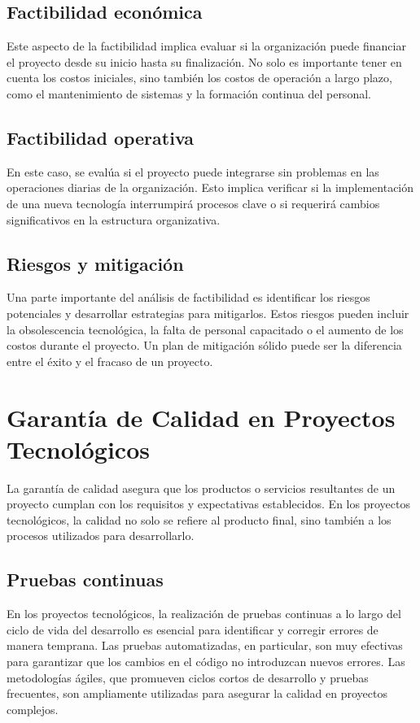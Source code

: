 \documentclass[12pt]{article}
\begin{document}
\subsection{Factibilidad económica}
Este aspecto de la factibilidad implica evaluar si la organización puede financiar el proyecto desde su inicio hasta su finalización. No solo es importante tener en cuenta los costos iniciales, sino también los costos de operación a largo plazo, como el mantenimiento de sistemas y la formación continua del personal.

\subsection{Factibilidad operativa}
En este caso, se evalúa si el proyecto puede integrarse sin problemas en las operaciones diarias de la organización. Esto implica verificar si la implementación de una nueva tecnología interrumpirá procesos clave o si requerirá cambios significativos en la estructura organizativa.

\subsection{Riesgos y mitigación}
Una parte importante del análisis de factibilidad es identificar los riesgos potenciales y desarrollar estrategias para mitigarlos. Estos riesgos pueden incluir la obsolescencia tecnológica, la falta de personal capacitado o el aumento de los costos durante el proyecto. Un plan de mitigación sólido puede ser la diferencia entre el éxito y el fracaso de un proyecto.

\section{Garantía de Calidad en Proyectos Tecnológicos}
La garantía de calidad asegura que los productos o servicios resultantes de un proyecto cumplan con los requisitos y expectativas establecidos. En los proyectos tecnológicos, la calidad no solo se refiere al producto final, sino también a los procesos utilizados para desarrollarlo.

\subsection{Pruebas continuas}
En los proyectos tecnológicos, la realización de pruebas continuas a lo largo del ciclo de vida del desarrollo es esencial para identificar y corregir errores de manera temprana. Las pruebas automatizadas, en particular, son muy efectivas para garantizar que los cambios en el código no introduzcan nuevos errores. Las metodologías ágiles, que promueven ciclos cortos de desarrollo y pruebas frecuentes, son ampliamente utilizadas para asegurar la calidad en proyectos complejos.
\end{document}
